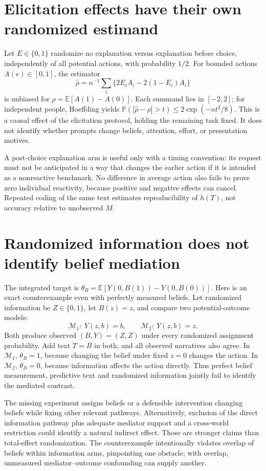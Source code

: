 \documentclass[11pt,a4paper]{article}
\newcommand{\E}{\mathbb E}
\newcommand{\Prb}{\mathbb P}
\begin{document}
\section{Elicitation effects have their own randomized estimand}
Let $E\in\{0,1\}$ randomize no explanation versus explanation before choice, independently of all potential actions, with probability $1/2$. For bounded actions $A(e)\in[0,1]$, the estimator
\[
 \widehat\rho=n^{-1}\sum_i\{2E_iA_i-2(1-E_i)A_i\}
\]
is unbiased for $\rho=\E[A(1)-A(0)]$. Each summand lies in $[-2,2]$; for independent people, Hoeffding yields $\Prb(|\widehat\rho-\rho|>t)\le2\exp(-nt^2/8)$. This is a causal effect of the elicitation protocol, holding the remaining task fixed. It does not identify whether prompts change beliefs, attention, effort, or presentation motives.

A post-choice explanation arm is useful only with a timing convention: its request must not be anticipated in a way that changes the earlier action if it is intended as a nonreactive benchmark. No difference in average action also fails to prove zero individual reactivity, because positive and negative effects can cancel. Repeated coding of the same text estimates reproducibility of $h(T)$, not accuracy relative to unobserved $M$.

\section{Randomized information does not identify belief mediation}
The integrated target is $\theta_B=\E[Y(0,B(1))-Y(0,B(0))]$. Here is an exact counterexample even with perfectly measured beliefs. Let randomized information be $Z\in\{0,1\}$, let $B(z)=z$, and compare two potential-outcome models:
\[
 \mathcal M_1:\ Y(z,b)=b,\qquad
 \mathcal M_2:\ Y(z,b)=z.
\]
Both produce observed $(B,Y)=(Z,Z)$ under every randomized assignment probability. Add text $T=B$ in both, and all observed narratives also agree. In $\mathcal M_1$, $\theta_B=1$, because changing the belief under fixed $z=0$ changes the action. In $\mathcal M_2$, $\theta_B=0$, because information affects the action directly. Thus perfect belief measurement, predictive text and randomized information jointly fail to identify the mediated contrast.

The missing experiment assigns beliefs or a defensible intervention changing beliefs while fixing other relevant pathways. Alternatively, exclusion of the direct information pathway plus adequate mediator support and a cross-world restriction could identify a natural indirect effect. Those are stronger claims than total-effect randomization. The counterexample intentionally violates overlap of beliefs within information arms, pinpointing one obstacle; with overlap, unmeasured mediator--outcome confounding can supply another.
\end{document}

